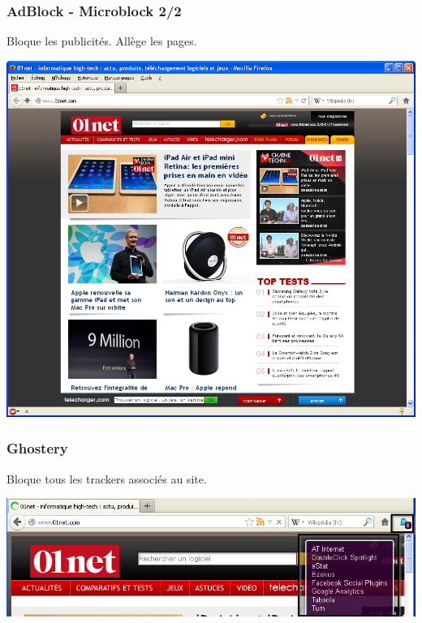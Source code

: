 \documentclass{beamer}
\begin{document}
\begin{frame}
\frametitle{AdBlock - Microblock 2/2}
Bloque les publicités. Allège les pages.

\begin{center}
\includegraphics[scale=0.4] {./images/Adblock02.png}
\end{center}
\end{frame}

\begin{frame}
\frametitle{Ghostery}

Bloque tous les trackers associés au site.
\begin{center}
\includegraphics[scale=0.4] {./images/Ghostery_tracker.png}
\end{center}
\end{frame}
\end{document}
